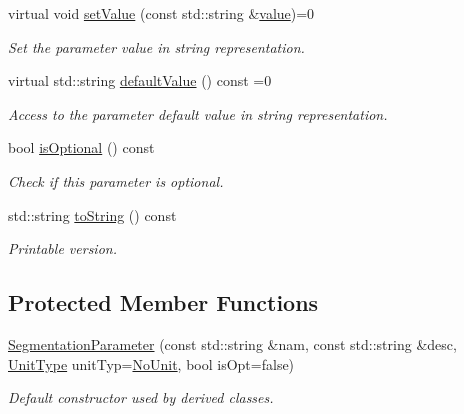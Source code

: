 \begin{DoxyCompactItemize}
virtual void \hyperlink{class_d_d4hep_1_1_d_d_segmentation_1_1_segmentation_parameter_a91e9dae172660687daec4de4d730b192}{set\+Value} (const std\+::string \&\hyperlink{class_d_d4hep_1_1_d_d_segmentation_1_1_segmentation_parameter_a633dffe9e53306c5f67568ff5e567387}{value})=0
\begin{DoxyCompactList}\small\item\em Set the parameter value in string representation. \end{DoxyCompactList}\item 
virtual std\+::string \hyperlink{class_d_d4hep_1_1_d_d_segmentation_1_1_segmentation_parameter_a2ef4dee84f8c9172aca49908c8fff136}{default\+Value} () const =0
\begin{DoxyCompactList}\small\item\em Access to the parameter default value in string representation. \end{DoxyCompactList}\item 
bool \hyperlink{class_d_d4hep_1_1_d_d_segmentation_1_1_segmentation_parameter_a24de6da5ac6df1dff911b6b437e0f07f}{is\+Optional} () const
\begin{DoxyCompactList}\small\item\em Check if this parameter is optional. \end{DoxyCompactList}\item 
std\+::string \hyperlink{class_d_d4hep_1_1_d_d_segmentation_1_1_segmentation_parameter_a30dd377a22d218dd74cb6f278b85b416}{to\+String} () const
\begin{DoxyCompactList}\small\item\em Printable version. \end{DoxyCompactList}\end{DoxyCompactItemize}
\subsection*{Protected Member Functions}
\begin{DoxyCompactItemize}
\item 
\hyperlink{class_d_d4hep_1_1_d_d_segmentation_1_1_segmentation_parameter_ae3d7cad507474b45ed2aea1629b8a919}{Segmentation\+Parameter} (const std\+::string \&nam, const std\+::string \&desc, \hyperlink{class_d_d4hep_1_1_d_d_segmentation_1_1_segmentation_parameter_a36f5f8b8d812b2a2b81363377565d8d4}{Unit\+Type} unit\+Typ=\hyperlink{class_d_d4hep_1_1_d_d_segmentation_1_1_segmentation_parameter_a36f5f8b8d812b2a2b81363377565d8d4ab217a538e0ac077135786260a2221c14}{No\+Unit}, bool is\+Opt=false)
\begin{DoxyCompactList}\small\item\em Default constructor used by derived classes. \end{DoxyCompactList}\end{DoxyCompactItemize}
